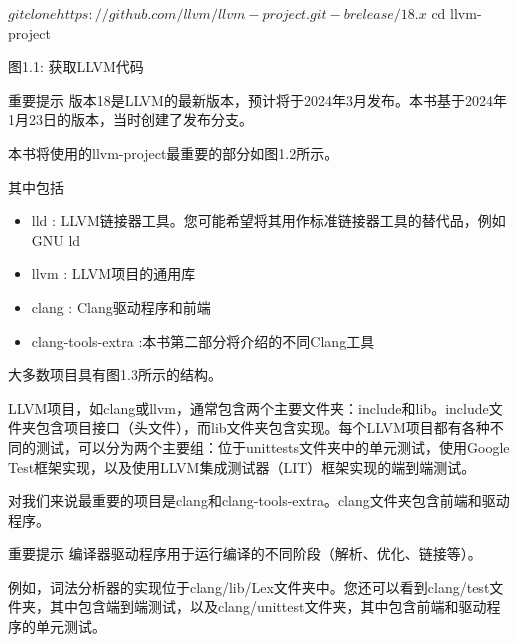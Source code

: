 \begin{shell}
$ git clone https://github.com/llvm/llvm-project.git -b release/18.x
$ cd llvm-project
\end{shell}

\begin{center}
图1.1: 获取LLVM代码
\end{center}


\begin{myNotic}{重要提示}
版本18是LLVM的最新版本，预计将于2024年3月发布。本书基于2024年1月23日的版本，当时创建了发布分支。
\end{myNotic}


本书将使用的llvm-project最重要的部分如图1.2所示。


其中包括

\begin{itemize}
\item
lld : LLVM链接器工具。您可能希望将其用作标准链接器工具的替代品，例如GNU ld

\item
llvm : LLVM项目的通用库

\item
clang :  Clang驱动程序和前端

\item
clang-tools-extra :本书第二部分将介绍的不同Clang工具
\end{itemize}

大多数项目具有图1.3所示的结构。


LLVM项目，如clang或llvm，通常包含两个主要文件夹：include和lib。include文件夹包含项目接口（头文件），而lib文件夹包含实现。每个LLVM项目都有各种不同的测试，可以分为两个主要组：位于unittests文件夹中的单元测试，使用Google Test框架实现，以及使用LLVM集成测试器（LIT）框架实现的端到端测试。

对我们来说最重要的项目是clang和clang-tools-extra。clang文件夹包含前端和驱动程序。

\begin{myNotic}{重要提示}
编译器驱动程序用于运行编译的不同阶段（解析、优化、链接等）。
\end{myNotic}


例如，词法分析器的实现位于clang/lib/Lex文件夹中。您还可以看到clang/test文件夹，其中包含端到端测试，以及clang/unittest文件夹，其中包含前端和驱动程序的单元测试。

